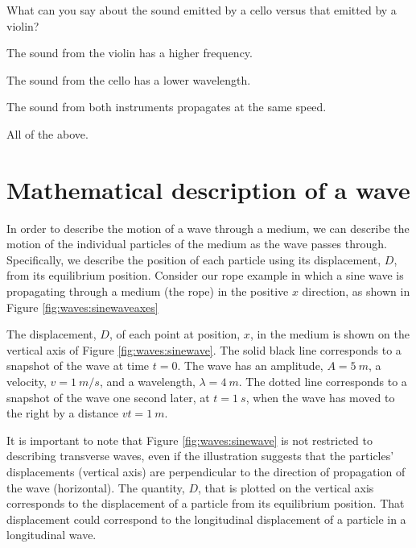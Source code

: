 \begin{checkpoint}
\begin{MCquestion}{What can you say about the sound emitted by a cello versus that emitted by a violin?}
\item The sound from the violin has a higher frequency.
\item The sound from the cello has a lower wavelength.
\item The sound from both instruments propagates at the same speed.
\item All of the above. \correct
\end{MCquestion}
\end{checkpoint}

\section{Mathematical description of a wave}
In order to describe the motion of a wave through a medium, we can describe the motion of the individual particles of the medium as the wave passes through. Specifically, we describe the position of each particle using its displacement, $D$, from its equilibrium position. Consider our rope example in which a sine wave is propagating through a medium (the rope) in the positive $x$ direction, as shown in Figure \ref{fig:waves:sinewaveaxes}


The displacement, $D$, of each point at position, $x$, in the medium is shown on the vertical axis of Figure \ref{fig:waves:sinewave}. The solid black line corresponds to a snapshot of the wave at time $t=0$. The wave has an amplitude, $A=\SI{5}{m}$, a velocity, $v=\SI{1}{m/s}$, and a wavelength, $\lambda=\SI{4}{m}$. The dotted line corresponds to a snapshot of the wave one second later, at $t=\SI{1}{s}$, when the wave has moved to the right by a distance $vt=\SI{1}{m}$.

It is important to note that Figure \ref{fig:waves:sinewave} is not restricted to describing transverse waves, even if the illustration suggests that the particles' displacements (vertical axis) are perpendicular to the direction of propagation of the wave (horizontal). The quantity, $D$, that is plotted on the vertical axis corresponds to the displacement of a particle from its equilibrium position. That displacement could correspond to the longitudinal displacement of a particle in a longitudinal wave.

